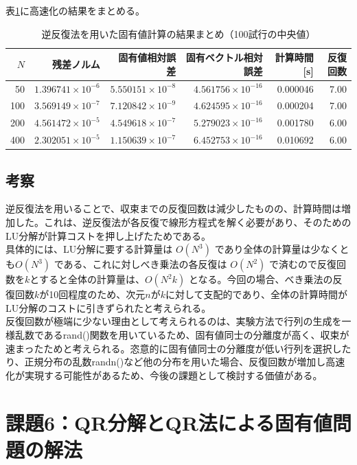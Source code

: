 \documentclass[a4paper,11pt]{ltjsarticle}
\begin{document}
表\ref{tab:exp4_summary}に高速化の結果をまとめる。

\begin{table}[H]
\centering
\caption{逆反復法を用いた固有値計算の結果まとめ（100試行の中央値）}
\label{tab:exp4_summary}
\begin{tabular}{r|r|r|r|r|r}
\hline
$N$ & 残差ノルム & 固有値相対誤差 & 固有ベクトル相対誤差 & 計算時間 [s] & 反復回数 \\
\hline
50 & $1.396741\times10^{-6}$ & $5.550151\times10^{-8}$ & $4.561756\times10^{-16}$ & 0.000046 & 7.00 \\
100 & $3.569149\times10^{-7}$ & $7.120842\times10^{-9}$ & $4.624595\times10^{-16}$ & 0.000204 & 7.00 \\
200 & $4.561472\times10^{-5}$ & $4.549618\times10^{-7}$ & $5.279023\times10^{-16}$ & 0.001780 & 6.00 \\
400 & $2.302051\times10^{-5}$ & $1.150639\times10^{-7}$ & $6.452753\times10^{-16}$ & 0.010692 & 6.00 \\
\hline
\end{tabular}
\end{table}

\subsection{考察}
逆反復法を用いることで、収束までの反復回数は減少したものの、計算時間は増加した。これは、逆反復法が各反復で線形方程式を解く必要があり、そのためのLU分解が計算コストを押し上げたためである。\\

具体的には、LU分解に要する計算量は $O(N^3)$ であり全体の計算量は少なくとも$O(N^3)$ である、これに対しべき乗法の各反復は $O(N^2)$ で済むので反復回数を$k$とすると全体の計算量は、$O(N^2k)$ となる。今回の場合、べき乗法の反復回数$k$が10回程度のため、次元$n$が$k$に対して支配的であり、全体の計算時間がLU分解のコストに引きずられたと考えられる。\\

反復回数が極端に少ない理由として考えられるのは、実験方法で行列の生成を一様乱数であるrand()関数を用いているため、固有値同士の分離度が高く、収束が速まったためと考えられる。恣意的に固有値同士の分離度が低い行列を選択したり、正規分布の乱数randn()など他の分布を用いた場合、反復回数が増加し高速化が実現する可能性があるため、今後の課題として検討する価値がある。


\section{課題6：QR分解とQR法による固有値問題の解法}
\end{document}

